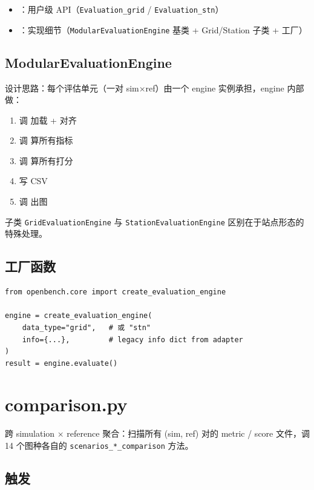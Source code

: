 \begin{itemize}
  \item {}：用户级 API（\texttt{Evaluation\_grid} / \texttt{Evaluation\_stn}）
  \item {}：实现细节（\texttt{ModularEvaluationEngine} 基类 + Grid/Station 子类 + 工厂）
\end{itemize}

\subsection{ModularEvaluationEngine}

设计思路：每个评估单元（一对 sim×ref）由一个 engine 实例承担，engine 内部做：

\begin{enumerate}
  \item 调  加载 + 对齐
  \item 调  算所有指标
  \item 调  算所有打分
  \item 写 CSV
  \item 调  出图
\end{enumerate}

子类 \texttt{GridEvaluationEngine} 与 \texttt{StationEvaluationEngine} 区别在于站点形态的特殊处理。

\subsection{工厂函数}

\begin{verbatim}
from openbench.core import create_evaluation_engine

engine = create_evaluation_engine(
    data_type="grid",   # 或 "stn"
    info={...},         # legacy info dict from adapter
)
result = engine.evaluate()
\end{verbatim}

\section{comparison.py}

跨 simulation × reference 聚合：扫描所有 (sim, ref) 对的 metric / score 文件，调 14 个图种各自的 \texttt{scenarios\_*\_comparison} 方法。

\subsection{触发}

